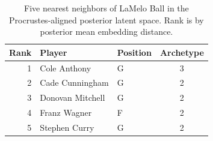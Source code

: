 \begin{table}[htbp]
  \centering\small
  \begin{tabular}{rllc}
    \toprule
    Rank & Player & Position & Archetype \\
    \midrule
    1 & Cole Anthony & G & 3 \\
    2 & Cade Cunningham & G & 2 \\
    3 & Donovan Mitchell & G & 2 \\
    4 & Franz Wagner & F & 2 \\
    5 & Stephen Curry & G & 2 \\
    \bottomrule
  \end{tabular}
  \caption{Five nearest neighbors of LaMelo Ball in the Procrustes-aligned posterior latent space. Rank is by posterior mean embedding distance.}
  \label{tab:LaMelo_Ball_neighbors}
\end{table}

